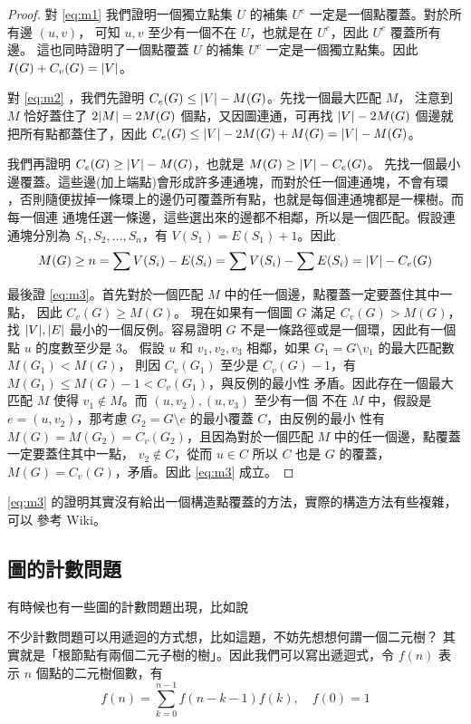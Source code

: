 \documentclass[a4paper,12pt]{book}
\begin{document}
\begin{proof}
  對 \eqref{eq:m1} 我們證明一個獨立點集 $U$ 的補集 $U^c$ 一定是一個點覆蓋。對於所有邊 $(u, v)$，
  可知 $u, v$ 至少有一個不在 $U$，也就是在 $U^c$，因此 $U^c$ 覆蓋所有邊。
  這也同時證明了一個點覆蓋 $U$ 的補集 $U^c$ 一定是一個獨立點集。因此 $I(G) + C_v(G) = \lvert V \rvert$。

  對 \eqref{eq:m2} ，我們先證明 $C_e(G) \leq \lvert V \rvert - M(G)$。先找一個最大匹配 $M$，
  注意到 $M$ 恰好蓋住了 $2\lvert M \rvert = 2 M(G)$ 個點，又因圖連通，可再找 $\lvert V \rvert - 2 M(G)$
  個邊就把所有點都蓋住了，因此 $C_e(G) \leq \lvert V \rvert - 2 M(G) + M(G) = \lvert V \rvert - M(G)$。

  我們再證明 $C_e(G) \geq \lvert V \rvert - M(G)$，也就是 $M(G) \geq \lvert V \rvert - C_e(G)$。
  先找一個最小邊覆蓋。這些邊(加上端點)會形成許多連通塊，而對於任一個連通塊，不會有環
  ，否則隨便拔掉一條環上的邊仍可覆蓋所有點，也就是每個連通塊都是一棵樹。而每一個連
  通塊任選一條邊，這些選出來的邊都不相鄰，所以是一個匹配。假設連通塊分別為
  $S_1, S_2, \dots, S_n$，有 $V(S_1) = E(S_1) + 1$。因此
  \[ M(G) \geq n = \sum V(S_i) - E(S_i) = \sum V(S_i) - \sum E(S_i) = \lvert V \rvert - C_e(G) \]
  
  最後證 \eqref{eq:m3}。首先對於一個匹配 $M$ 中的任一個邊，點覆蓋一定要蓋住其中一點，
  因此 $C_v(G) \geq M(G)$。 現在如果有一個圖 $G$ 滿足 $C_v(G) > M(G)$，找 $\lvert V \rvert, \lvert E \rvert$
  最小的一個反例。容易證明 $G$ 不是一條路徑或是一個環，因此有一個點 $u$ 的度數至少是 $3$。
  假設 $u$ 和 $v_1, v_2, v_3$ 相鄰，如果 $G_1 = G \setminus v_1$ 的最大匹配數 $M(G_1) < M(G)$，
  則因 $C_v(G_1)$ 至少是 $C_v(G) - 1$，有 $M(G_1) \leq M(G) - 1 < C_v(G_1)$，與反例的最小性
  矛盾。因此存在一個最大匹配 $M$ 使得 $v_1 \notin M$。而 $(u, v_2), (u, v_3)$ 至少有一個
  不在 $M$ 中，假設是 $e = (u, v_2)$，那考慮 $G_2 = G \setminus e$ 的最小覆蓋 $C$，由反例的最小
  性有 $M(G) = M(G_2) = C_v(G_2)$，且因為對於一個匹配 $M$ 中的任一個邊，點覆蓋一定要蓋住其中一點，
  $v_2 \notin C$，從而 $u \in C$ 所以 $C$ 也是 $G$ 的覆蓋，$M(G) = C_v(G)$，矛盾。因此
  \eqref{eq:m3} 成立。
\end{proof}

\eqref{eq:m3} 的證明其實沒有給出一個構造點覆蓋的方法，實際的構造方法有些複雜，可以
參考 Wiki。

\subsection{圖的計數問題}
有時候也有一些圖的計數問題出現，比如說

不少計數問題可以用遞迴的方式想，比如這題，不妨先想想何謂一個二元樹？
其實就是「根節點有兩個二元子樹的樹」。因此我們可以寫出遞迴式，令
$f(n)$ 表示 $n$ 個點的二元樹個數，有
\[ f(n) = \sum_{k = 0}^{n-1} f(n-k-1) f(k) , \quad f(0) = 1\] 
\end{document}
